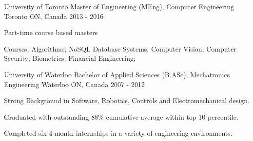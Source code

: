 

\begin{cventries}

  \cventry
    {University of Toronto} %
    {Master of Engineering (MEng), Computer Engineering} %
    {Toronto ON, Canada} %
    {2013 - 2016} %
    {
      \begin{cvitems} %
        \item {Part-time course based masters}
        \item {Courses: Algorithms; NoSQL Database Systems; Computer Vision; Computer Security; Biometrics; Financial Engineering;}
      \end{cvitems}
    }

  \cventry
    {University of Waterloo} %
    {Bachelor of Applied Sciences (B.ASc), Mechatronics Engineering} %
    {Waterloo ON, Canada} %
    {2007 - 2012} %
    {
      \begin{cvitems} %
        \item {Strong Background in Software, Robotics, Controls and Electromechanical design.}
        \item {Graduated with outstanding 88\% cumulative average within top 10 percentile.}
        \item {Completed six 4-month internships in a variety of engineering environments.}
      \end{cvitems}
    }

\end{cventries}
